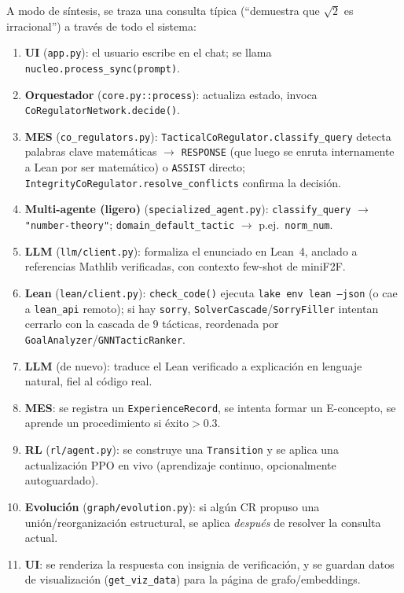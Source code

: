 \documentclass[11pt,a4paper]{report}
\newcommand{\code}[1]{\texttt{#1}}
\begin{document}
A modo de s\'intesis, se traza una consulta t\'ipica (``demuestra que $\sqrt{2}$ es irracional'') a trav\'es de todo el sistema:

\begin{enumerate}
  \item \textbf{UI} (\code{app.py}): el usuario escribe en el chat; se llama \code{nucleo.process_sync(prompt)}.
  \item \textbf{Orquestador} (\code{core.py::process}): actualiza estado, invoca \code{CoRegulatorNetwork.decide()}.
  \item \textbf{MES} (\code{co_regulators.py}): \code{TacticalCoRegulator.classify_query} detecta palabras clave matem\'aticas $\to$ \code{RESPONSE} (que luego se enruta internamente a Lean por ser matem\'atico) o \code{ASSIST} directo; \code{IntegrityCoRegulator.resolve_conflicts} confirma la decisi\'on.
  \item \textbf{Multi-agente (ligero)} (\code{specialized_agent.py}): \code{classify_query} $\to$ \code{"number-theory"}; \code{domain_default_tactic} $\to$ p.ej.\ \code{norm\_num}.
  \item \textbf{LLM} (\code{llm/client.py}): formaliza el enunciado en Lean~4, anclado a referencias Mathlib verificadas, con contexto few-shot de miniF2F.
  \item \textbf{Lean} (\code{lean/client.py}): \code{check_code()} ejecuta \code{lake env lean --json} (o cae a \code{lean\_api} remoto); si hay \code{sorry}, \code{SolverCascade}/\code{SorryFiller} intentan cerrarlo con la cascada de 9 t\'acticas, reordenada por \code{GoalAnalyzer}/\code{GNNTacticRanker}.
  \item \textbf{LLM} (de nuevo): traduce el Lean verificado a explicaci\'on en lenguaje natural, fiel al c\'odigo real.
  \item \textbf{MES}: se registra un \code{ExperienceRecord}, se intenta formar un E-concepto, se aprende un procedimiento si \'exito$>0.3$.
  \item \textbf{RL} (\code{rl/agent.py}): se construye una \code{Transition} y se aplica una actualizaci\'on PPO en vivo (aprendizaje continuo, opcionalmente autoguardado).
  \item \textbf{Evoluci\'on} (\code{graph/evolution.py}): si alg\'un CR propuso una uni\'on/reorganizaci\'on estructural, se aplica \emph{despu\'es} de resolver la consulta actual.
  \item \textbf{UI}: se renderiza la respuesta con insignia de verificaci\'on, y se guardan datos de visualizaci\'on (\code{get_viz_data}) para la p\'agina de grafo/embeddings.
\end{enumerate}
\end{document}
